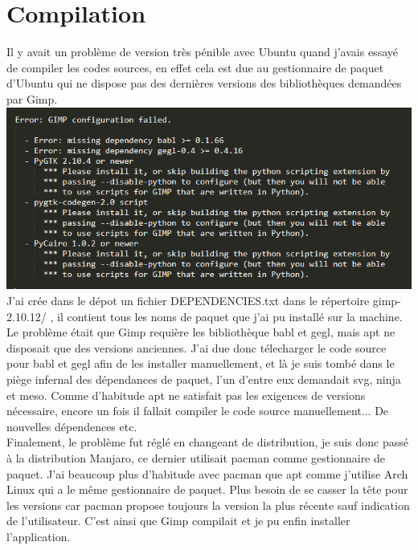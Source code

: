 \documentclass[12pt, letterpaper]{article}
\begin{document}
\section{Compilation}
Il y avait un problème de version très pénible avec Ubuntu quand j'avais essayé de compiler les codes sources, en effet cela est due au gestionnaire de paquet d'Ubuntu qui ne dispose pas des dernières versions des bibliothèques demandées par Gimp.\\
\includegraphics[width=\linewidth]{c1.png}
J'ai crée dans le dépot un fichier DEPENDENCIES.txt dans le répertoire gimp-2.10.12/ , il contient tous les noms de paquet que j'ai pu installé sur la machine.\\
Le problème était que Gimp requière les bibliothèque babl et gegl, mais apt ne disposait que des versions anciennes.
J'ai due donc télecharger le code source pour babl et gegl afin de les installer manuellement, et là je suis tombé dans le piège infernal des dépendances de paquet, l'un d'entre eux demandait svg, ninja et meso. Comme d'habitude apt ne satisfait pas les exigences de versions nécessaire, encore un fois il fallait compiler le code source manuellement... De nouvelles dépendences etc.\\
Finalement, le problème fut réglé en changeant de distribution, je suis donc passé à la distribution Manjaro, ce dernier utilisait pacman comme gestionnaire de paquet. J'ai beaucoup plus d'habitude avec pacman que apt comme j'utilise Arch Linux qui a le même gestionnaire de paquet. Plus besoin de se casser la tête pour les versions car pacman propose toujours la version la plus récente sauf indication de l'utilisateur.
C'est ainsi que Gimp compilait et je pu enfin installer l'application.
\end{document}
